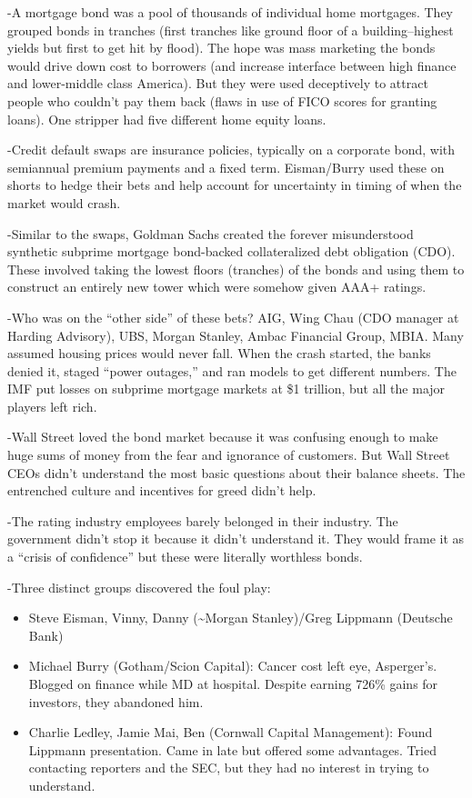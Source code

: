 \documentclass[
]{article}
\begin{document}
-A mortgage bond was a pool of thousands of individual home mortgages.
They grouped bonds in tranches (first tranches like ground floor of a
building--highest yields but first to get hit by flood). The hope was
mass marketing the bonds would drive down cost to borrowers (and
increase interface between high finance and lower-middle class America).
But they were used deceptively to attract people who couldn't pay them
back (flaws in use of FICO scores for granting loans). One stripper had
five different home equity loans.

-Credit default swaps are insurance policies, typically on a corporate
bond, with semiannual premium payments and a fixed term. Eisman/Burry
used these on shorts to hedge their bets and help account for
uncertainty in timing of when the market would crash.

-Similar to the swaps, Goldman Sachs created the forever misunderstood
synthetic subprime mortgage bond-backed collateralized debt obligation
(CDO). These involved taking the lowest floors (tranches) of the bonds
and using them to construct an entirely new tower which were somehow
given AAA+ ratings.

-Who was on the ``other side'' of these bets? AIG, Wing Chau (CDO
manager at Harding Advisory), UBS, Morgan Stanley, Ambac Financial
Group, MBIA. Many assumed housing prices would never fall. When the
crash started, the banks denied it, staged ``power outages,'' and ran
models to get different numbers. The IMF put losses on subprime mortgage
markets at \$1 trillion, but all the major players left rich.

-Wall Street loved the bond market because it was confusing enough to
make huge sums of money from the fear and ignorance of customers. But
Wall Street CEOs didn't understand the most basic questions about their
balance sheets. The entrenched culture and incentives for greed didn't
help.

-The rating industry employees barely belonged in their industry. The
government didn't stop it because it didn't understand it. They would
frame it as a ``crisis of confidence'' but these were literally
worthless bonds.

-Three distinct groups discovered the foul play:

\begin{itemize}
\item
  Steve Eisman, Vinny, Danny (\textasciitilde Morgan Stanley)/Greg
  Lippmann (Deutsche Bank)
\item
  Michael Burry (Gotham/Scion Capital): Cancer cost left eye,
  Asperger's. Blogged on finance while MD at hospital. Despite earning
  726\% gains for investors, they abandoned him.
\item
  Charlie Ledley, Jamie Mai, Ben (Cornwall Capital Management): Found
  Lippmann presentation. Came in late but offered some advantages. Tried
  contacting reporters and the SEC, but they had no interest in trying
  to understand.
\end{itemize}
\end{document}
